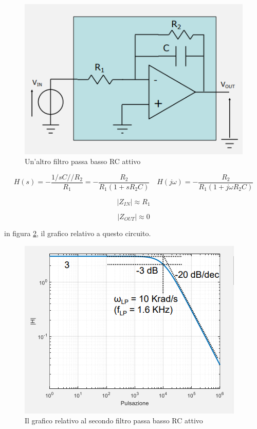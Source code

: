 \documentclass{article}
\begin{document}
\begin{figure}[h]
  \centering
  \includegraphics[scale=0.7]{IM_filtro_passa_basso_RC_attivo_bis}
  \caption{Un'altro filtro passa basso RC attivo}
  \label{Schema_filtro_passa_basso_RC_attivo_bis}
\end{figure}

\[H(s) = - \frac{1/sC // R_2}{R_1} = -  \frac{R_2}{R_1 (1 + sR_2 C)} \quad H(j \omega) = - \frac{R_2}{R_1 (1 + j \omega R_2 C)}\]

\[|Z_{IN}| \approx R_1\]

\[|Z_{OUT}| \approx 0\]

in figura \ref{Schema_filtro_passa_basso_RC_attivo_grafici}, il grafico relativo a questo circuito.

\clearpage
\begin{figure}[h]
  \centering
  \includegraphics[scale=0.7]{IM_filtro_passa_basso_RC_attivo_grafici}
  \caption{Il grafico relativo al secondo filtro passa basso RC attivo}
  \label{Schema_filtro_passa_basso_RC_attivo_grafici}
\end{figure}
\end{document}
